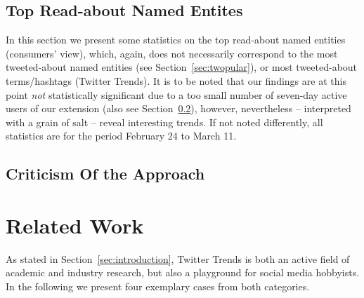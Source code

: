 \documentclass[runningheads,a4paper]{llncs}
\begin{document}
\subsection{Top Read-about Named Entites}
In this section we present some statistics on the top read-about named entities (consumers' view), which, again, does not necessarily correspond to the most tweeted-about named entities (see Section~\ref{sec:twopular}), or most tweeted-about terms/hashtags (Twitter Trends). It is to be noted that our findings are at this point \textit{not} statistically significant due to a too small number of seven-day active users of our extension (also see Section~\ref{sec:criticism}), however, nevertheless -- interpreted with a grain of salt -- reveal interesting trends. If not noted differently, all statistics are for the period February 24 to March 11.

\subsection{Criticism Of the Approach}\label{sec:criticism}

\section{Related Work}\label{sec:relatedwork}
As stated in Section~\ref{sec:introduction}, Twitter Trends is both an active field of academic and industry research, but also a playground for social media hobbyists. In the following we present four exemplary cases from both categories.
\end{document}
